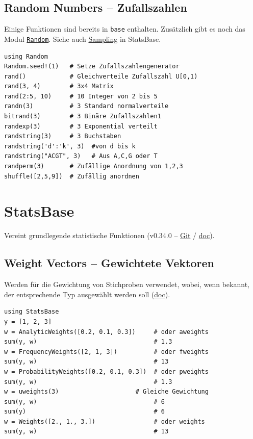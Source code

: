 \documentclass[10pt,twocolumn]{scrartcl}
\begin{document}
\subsection{Random Numbers -- Zufallszahlen}
\label{ssec:standardLibrary_Random}

Einige Funktionen sind bereits in \lstinline|base| enthalten. Zusätzlich gibt es
noch das Modul
\href{https://docs.julialang.org/en/v1/stdlib/Random/}{\lstinline|Random|}.
Siehe auch \hyperref[ssec:StatsBase_Sampling]{Sampling} in StatsBase.

\begin{lstlisting}
using Random
Random.seed!(1)   # Setze Zufallszahlengenerator
rand()            # Gleichverteile Zufallszahl U[0,1)
rand(3, 4)        # 3x4 Matrix
rand(2:5, 10)     # 10 Integer von 2 bis 5
randn(3)          # 3 Standard normalverteile
bitrand(3)        # 3 Binäre Zufallszahlen1
randexp(3)        # 3 Exponential verteilt
randstring(3)     # 3 Buchstaben
randstring('d':'k', 3)  #von d bis k
randstring("ACGT", 3)   # Aus A,C,G oder T
randperm(3)       # Zufällige Anordnung von 1,2,3
shuffle([2,5,9])  # Zufällig anordnen
\end{lstlisting}

\section{StatsBase}
\label{sec:StatsBase}

Vereint grundlegende statistische Funktionen (v0.34.0 --
\href{https://github.com/JuliaStats/StatsBase.jl}{Git} /
\href{https://juliastats.org/StatsBase.jl/stable/}{doc}).

\subsection{Weight Vectors -- Gewichtete Vektoren}

Werden für die Gewichtung von Stichproben verwendet, wobei, wenn bekannt, der
entsprechende Typ ausgewählt werden soll
(\href{https://juliastats.org/StatsBase.jl/stable/weights/}{doc}).

\begin{lstlisting}
using StatsBase
y = [1, 2, 3]
w = AnalyticWeights([0.2, 0.1, 0.3])     # oder aweights
sum(y, w)                                # 1.3
w = FrequencyWeights([2, 1, 3])          # oder fweights
sum(y, w)                                # 13
w = ProbabilityWeights([0.2, 0.1, 0.3])  # oder pweights
sum(y, w)                                # 1.3
w = uweights(3)                     # Gleiche Gewichtung
sum(y, w)                                # 6
sum(y)                                   # 6
w = Weights([2., 1., 3.])                # oder weights
sum(y, w)                                # 13
\end{lstlisting}
\end{document}
